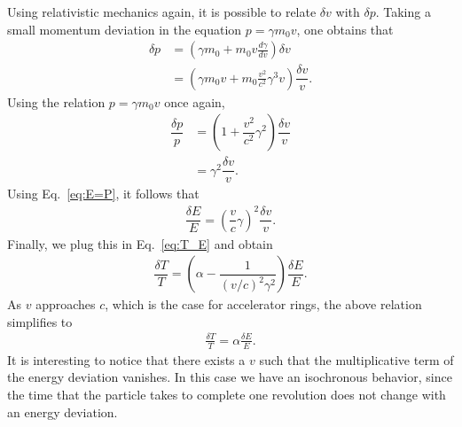 Using relativistic mechanics again, it is possible to relate $\delta v$ with $\delta p$. Taking a small momentum deviation in the equation $p = \gamma m_0 v$, one obtains that
\begin{align*}
	\delta p &= \left(\gamma m_0 + m_0 v \frac{d\gamma}{dv}\right)\delta v\\
    		&= \left(\gamma m_0 v + m_0 \frac{v^2}{c^2} \gamma^3 v \right) \dfrac{\delta v}{v}.
\end{align*}
Using the relation $p = \gamma m_0 v$ once again,
\begin{align*}
	\dfrac{\delta p}{p} &= \left( 1 + \dfrac{v^2}{c^2}\gamma^2 \right) \dfrac{\delta v}{v}\\
    					&= \gamma^2 \dfrac{\delta v}{v}.
\end{align*}
Using Eq.~\eqref{eq:E=P}, it follows that
\begin{align}
	\dfrac{\delta E}{E} = \left( \dfrac{v}{c}\gamma \right)^2 \dfrac{\delta v}{v}.
\end{align}
Finally, we plug this in Eq.~\eqref{eq:T_E} and obtain
\begin{align}
	\dfrac{\delta T}{T} = \left( \alpha - \dfrac{1}{(v/c)^2\gamma^2} \right)\dfrac{\delta E}{E}.
\end{align}
As $v$ approaches $c$, which is the case for accelerator rings, the above relation simplifies to
\begin{align} \label{eq:3.15}
\frac{\delta T}{T} = \alpha \frac{\delta E}{E}.
\end{align}
It is interesting to notice that there exists a $v$ such that the multiplicative term of the energy deviation vanishes. In this case we have an isochronous behavior, since the time that the particle takes to complete one revolution does not change with an energy deviation.
